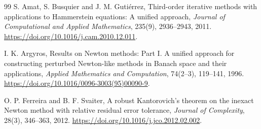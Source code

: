 \documentclass[11pt,a4paper]{article}
\numberwithin{equation}{section}
\numberwithin{table}{section}
\theoremstyle{plain}
\theoremstyle{definition}\newtheorem{definition}[theorem]{Definition}
\theoremstyle{remark}\newtheorem{remark}[theorem]{Remark}
\begin{document}
\begin{thebibliography}{99}
 S. Amat, S. Busquier and J. M. Guti\'errez, Third-order iterative methods with applications to Hammerstein equations: A unified approach, \textit{Journal of Computational and Applied Mathematics}, 235(9), 2936--2943, 2011. \url{https://doi.org/10.1016/j.cam.2010.12.011}.

 I. K. Argyros, Results on Newton methods: Part I. A unified approach for constructing perturbed Newton-like methods in Banach space and their applications, \textit{Applied Mathematics and Computation}, 74(2--3), 119--141, 1996. \url{https://doi.org/10.1016/0096-3003(95)00090-9}.

 O. P. Ferreira and B. F. Svaiter, A robust Kantorovich's theorem on the inexact Newton method with relative residual error tolerance, \textit{Journal of Complexity}, 28(3), 346--363, 2012. \url{https://doi.org/10.1016/j.jco.2012.02.002}.
\end{thebibliography}
\end{document}
